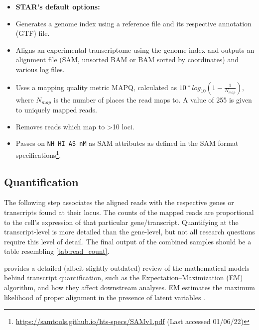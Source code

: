 
\begin{itemize}\itemsep0em
\item[] \textbf{STAR's default options:}
\item Generates a genome index using a reference file and its respective annotation (GTF) file.
\item Aligns an experimental transcriptome using the genome index and outputs an alignment file (SAM, unsorted BAM or BAM sorted by coordinates) and various log files.
\item Uses a mapping quality metric MAPQ, calculated as $10*log_{10}(1-\frac{1}{N_{map}})$, where ${N_{map}}$ is the number of places the read maps to. A value of 255 is given to uniquely mapped reads.
\item Removes reads which map to >10 loci.
\item Passes on \texttt{NH HI AS nM} as SAM attributes as defined in the SAM format specifications\footnote{\url{https://samtools.github.io/hts-specs/SAMv1.pdf} (Last accessed 01/06/22)}.
\end{itemize}


\subsection{Quantification}
\label{quantification}
The following step associates the aligned reads with the respective genes or transcripts found at their locus. The counts of the mapped reads are proportional to the cell's expression of that particular gene/transcript. Quantifying at the transcript-level is more detailed than the gene-level, but not all research questions require this level of detail. The final output of the combined samples should be a table resembling \autoref{tab:read_count}.

\cite{pachter2011models} provides a detailed (albeit slightly outdated) review of the mathematical models behind transcript quantification, such as the Expectation–Maximization (EM) algorithm, and how they affect downstream analyses. EM estimates the maximum likelihood of proper alignment in the presence of latent variables \citep{brownlee2019gentle, pachter2011models}.

